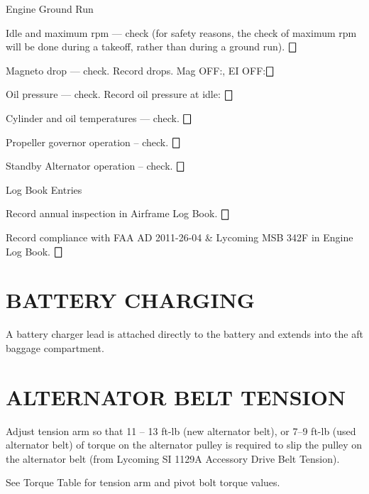 \begin{enumerate*}
\begin{enumerate*}
	\end{enumerate*}
	\item{Engine Ground Run}
	\begin{enumerate*}
		\item Idle and maximum rpm --- check (for safety reasons, the check of maximum rpm will be done during a takeoff, rather than during a ground run). \dotfill $\bigbox$
		\item Magneto drop --- check. Record drops. Mag OFF:\underline{\makebox[0.5in][l]{}}, EI OFF:\underline{\makebox[0.5in][l]{}}\dotfill $\bigbox$
		\item Oil pressure --- check. Record oil pressure at idle: \underline{\makebox[0.5in][l]{}} \dotfill $\bigbox$
		\item Cylinder and oil temperatures --- check. \dotfill $\bigbox$
		\item Propeller governor operation -- check. \dotfill $\bigbox$
		\item Standby Alternator operation -- check. \dotfill $\bigbox$
	\end{enumerate*}
	\item{Log Book Entries}
	\begin{enumerate*}
		\item Record annual inspection in Airframe Log Book. \dotfill $\bigbox$
		\item Record compliance with FAA AD 2011-26-04 \& Lycoming MSB 342F in Engine Log Book. \dotfill $\bigbox$
	\end{enumerate*}
\end{enumerate*}

\section{BATTERY CHARGING}
A battery charger lead is attached directly to the battery and extends into the aft baggage compartment. 


\section{ALTERNATOR BELT TENSION} 
\begin{enumerate*}
	\item Adjust tension arm so that 11 -- 13 ft-lb (new alternator belt), or 7--9 ft-lb (used alternator belt) of torque on the alternator pulley is required to slip the pulley on the alternator belt (from Lycoming SI 1129A Accessory Drive Belt Tension). 
	\item See Torque Table for tension arm and pivot bolt torque values. 
\end{enumerate*}

